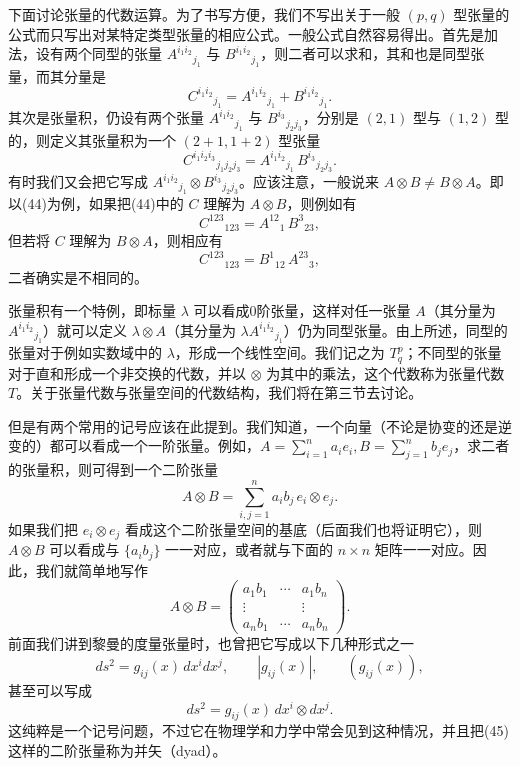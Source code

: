 下面讨论张量的代数运算。为了书写方便，我们不写出关于一般 $(p,q)$ 型张量的公式而只写出对某特定类型张量的相应公式。一般公式自然容易得出。首先是加法，设有两个同型的张量 $A^{i_1i_2}{}_{j_1}$ 与 $B^{i_1i_2}{}_{j_1}$，则二者可以求和，其和也是同型张量，而其分量是
\begin{equation}
 C^{i_1i_2}{}_{j_1}=A^{i_1i_2}{}_{j_1}+B^{i_1i_2}{}_{j_1}.
 \tag{43}
\end{equation}
其次是张量积，仍设有两个张量 $A^{i_1i_2}{}_{j_1}$ 与 $B^{i_3}{}_{j_2j_3}$，分别是 $(2,1)$ 型与 $(1,2)$ 型的，则定义其张量积为一个 $(2+1,1+2)$ 型张量
\begin{equation}
 C^{i_1i_2i_3}{}_{j_1j_2j_3}
 =A^{i_1i_2}{}_{j_1}\,B^{i_3}{}_{j_2j_3}.
 \tag{44}
\end{equation}
有时我们又会把它写成 $A^{i_1i_2}{}_{j_1}\otimes B^{i_3}{}_{j_2j_3}$。应该注意，一般说来 $A\otimes B\ne B\otimes A$。即以(44)为例，如果把(44)中的 $C$ 理解为 $A\otimes B$，则例如有
\[
 C^{123}{}_{123}=A^{12}{}_1\,B^3{}_{23},
\]
但若将 $C$ 理解为 $B\otimes A$，则相应有
\[
 C^{123}{}_{123}=B^1{}_{12}\,A^{23}{}_3,
\]
二者确实是不相同的。

张量积有一个特例，即标量 $\lambda$ 可以看成0阶张量，这样对任一张量 $A$（其分量为 $A^{i_1i_2}{}_{j_1}$）就可以定义 $\lambda\otimes A$（其分量为 $\lambda A^{i_1i_2}{}_{j_1}$）仍为同型张量。由上所述，同型的张量对于例如实数域中的 $\lambda$，形成一个线性空间。我们记之为 $T^p_q$；不同型的张量对于直和形成一个非交换的代数，并以 $\otimes$ 为其中的乘法，这个代数称为张量代数 $T$。关于张量代数与张量空间的代数结构，我们将在第三节去讨论。

但是有两个常用的记号应该在此提到。我们知道，一个向量（不论是协变的还是逆变的）都可以看成一个一阶张量。例如，$A=\sum_{i=1}^n a_i e_i,B=\sum_{j=1}^n b_j e_j$，求二者的张量积，则可得到一个二阶张量
\[
 A\otimes B=\sum_{i,j=1}^n a_i b_j\,e_i\otimes e_j.
\]
如果我们把 $e_i\otimes e_j$ 看成这个二阶张量空间的基底（后面我们也将证明它），则 $A\otimes B$ 可以看成与 $\{a_i b_j\}$ 一一对应，或者就与下面的 $n\times n$ 矩阵一一对应。因此，我们就简单地写作
\begin{equation}
 A\otimes B=
 \begin{pmatrix}
 a_1b_1&\cdots&a_1b_n\\
 \vdots&&\vdots\\
 a_nb_1&\cdots&a_nb_n
 \end{pmatrix}.
 \tag{45}
\end{equation}
前面我们讲到黎曼的度量张量时，也曾把它写成以下几种形式之一
\[
 ds^2=g_{ij}(x)\,dx^i dx^j,
 \qquad |g_{ij}(x)|,
 \qquad (g_{ij}(x)),
\]
甚至可以写成
\[
 ds^2=g_{ij}(x)\,dx^i\otimes dx^j.
\]
这纯粹是一个记号问题，不过它在物理学和力学中常会见到这种情况，并且把(45)这样的二阶张量称为并矢（dyad）。

